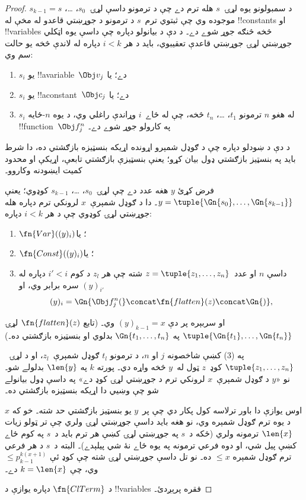 \documentclass[../../../include/open-logic-section]{subfiles}
\begin{document}
\begin{proof}
د سمبولونو يوه لړۍ~$s$ هله ترم دے چې د ترمونو داسې لړۍ~$s_0$،
\dots، $s_{k-1}=s$ موجوده وي چې ثبتوي ترم~$s$ د ترمونو د جوړښتي
قاعدو له مخې له !!{constant}s او !!{variable}s څخه څنګه جوړ شوے دے۔
د دې د بيانولو دپاره چې داسې يوه اټکلي جوړښتي لړۍ جوړښتي قاعدې
تعقيبوي، بايد د هر $i<k$ دپاره له لاندې څخه يو حالت سم وي:
\begin{enumerate}
\item $s_i$ يو !!a{variable}~$\Obj v_j$ دے؛ يا
\item $s_i$ يو !!a{constant}~$\Obj c_j$ دے؛ يا
\item $s_i$ له هغو $n$ ترمونو $t_1$، \dots، $t_n$ څخه، چې له
  ځاے~$i$ وړاندې راغلي وي، د يوه $n$-ځايه
  !!{function}~$\Obj f^n_j$ په کارولو جوړ شوے دے۔
\end{enumerate}
د دې د ښودلو دپاره چې د ګوډل شمېرو اړونده اړيکه بنسټيزه بازګشتي
ده، دا شرط بايد په بنسټيز بازګشتي ډول بيان کړو؛ يعنې بنسټيزې
بازګشتي تابعې، اړيکې او محدود کمیت ايښودنه وکاروو۔

فرض کړئ $y$ هغه عدد دے چې لړۍ~$s_0$، \dots، $s_{k-1}$ کوډوي؛ يعنې
$y = \tuple{\Gn{s_0}, \dots, \Gn{s_{k-1}}}$۔ دا د ګوډل شمېرې~$x$
لرونکي ترم دپاره هله جوړښتي لړۍ کوډوي چې د هر $i<k$ دپاره:
\begin{enumerate}
\item $\fn{Var}((y)_i)$؛ يا
\item $\fn{Const}((y)_i)$؛ يا
\item داسې $n$ او عدد~$z=\tuple{z_1, \dots, z_n}$ شته چې هر $z_l$
  د کوم $i'<i$ دپاره له $(y)_{i'}$ سره برابر وي، او
\[
(y)_i = \Gn{\Obj f^n_j(} \concat \fn{flatten}(z) \concat \Gn{)},
\]
\end{enumerate}
او سربېره پر دې $(y)_{k-1}=x$ وي۔ (تابع $\fn{flatten}(z)$ لړۍ
$\tuple{\Gn{t_1}, \dots, \Gn{t_n}}$ په $\Gn{t_1, \dots, t_n}$
بدلوي او بنسټيزه بازګشتي ده۔)

په (3) کښې شاخصونه $j$ او $n$، د ترمونو $t_l$ ګوډل شمېرې~$z_l$،
او د لړۍ~$\tuple{z_1, \dots, z_n}$ کوډ~$z$ ټول له~$y$ څخه واړه دي۔
پورته $k$ په $\len{y}$ بدلولے شو۔ نو «$y$ د ګوډل شمېرې~$x$ لرونکي
ترم د جوړښتي لړۍ کوډ دے» په داسې ډول بيانولے شو چې وښيي دا اړيکه
بنسټيزه بازګشتي ده۔

اوس يوازې دا باور ترلاسه کول پکار دي چې پر~$y$ يو بنسټيز بازګشتي حد
شته۔ خو که $x$ د يوه ترم ګوډل شمېره وي، نو هغه بايد داسې جوړښتي لړۍ
ولري چې تر ټولو زيات $\len{x}$ ترمونه ولري (ځکه د~$s$ په جوړښتي
لړۍ کښې هر ترم بايد د~$s$ په کوم ځاے کښې پيل شي، او دوه فرعي ترمونه
په يوه ځاے نۀ شي پيلېدے)۔ البته د~$s$ د هر فرعي ترم ګوډل شمېره
$\le x$ ده۔ نو تل داسې جوړښتي لړۍ شته چې کوډ ئې
$\le p_{k-1}^{k(x+1)}$ وي، چې $k=\len{x}$ دے۔

د $\fn{ClTerm}$ دپاره يوازې د !!{variable}s فقره پرېږدئ۔
\end{proof}
\end{document}
